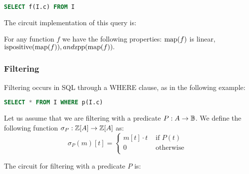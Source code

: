 \begin{lstlisting}[language=SQL]
SELECT f(I.c) FROM I
\end{lstlisting}

The circuit implementation of this query is:

\begin{center}
\end{center}

For any function $f$ we have the following properties:
$\mbox{map}(f)$ is linear, $\mbox{ispositive}(\mbox{map}(f)), and \mbox{zpp}(\mbox{map}(f)).$

\subsubsection{Filtering}

Filtering occurs in SQL through a WHERE clause, as in the following example:

\noindent
\begin{lstlisting}[language=SQL]
SELECT * FROM I WHERE p(I.c)
\end{lstlisting}

Let us assume that we are filtering with a predicate
$P: A \rightarrow \mathbb{B}$.  We define the following function $\sigma_P: \mathbb{Z}[A] \rightarrow \mathbb{Z}[A]$ as:
$$\sigma_P(m)[t] = \left\{
\begin{array}{ll}
  m[t] \cdot t & \mbox{ if } P(t) \\
  0 & \mbox{ otherwise } \\
\end{array}
\right.
$$

The circuit for filtering with a predicate $P$ is:

\begin{center}
\end{center}

